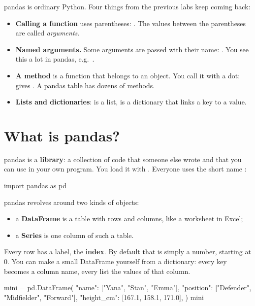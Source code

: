 \documentclass[11pt,a4paper]{article}
\begin{document}
pandas is ordinary Python. Four things from the previous labs keep
coming back:

\begin{itemize}
  \item \textbf{Calling a function} uses parentheses:
        . The values between the parentheses are
        called \emph{arguments}.
  \item \textbf{Named arguments.} Some arguments are passed with their
        name: . You see this a lot
        in pandas, e.g.\ .
  \item \textbf{A method} is a function that belongs to an object. You
        call it with a dot:  gives
        . A pandas table has dozens of methods.
  \item \textbf{Lists and dictionaries}:  is
        a list,  is a dictionary that links a
        key to a value.
\end{itemize}

\section{What is pandas?}

pandas is a \textbf{library}: a collection of code that someone else
wrote and that you can use in your own program. You load it with
. Everyone uses the short name :

\begin{python}[noout]
import pandas as pd
\end{python}

pandas revolves around two kinds of objects:

\begin{itemize}
  \item a \textbf{DataFrame} is a table with rows and columns, like a
        worksheet in Excel;
  \item a \textbf{Series} is one column of such a table.
\end{itemize}

Every row has a label, the \textbf{index}. By default that is simply a
number, starting at 0. You can make a small DataFrame yourself from a
dictionary: every key becomes a column name, every list the values of
that column.

\begin{python}
mini = pd.DataFrame({
    "name": ["Yana", "Stan", "Emma"],
    "position": ["Defender", "Midfielder", "Forward"],
    "height_cm": [167.1, 158.1, 171.0],
})
mini
\end{python}
\end{document}
